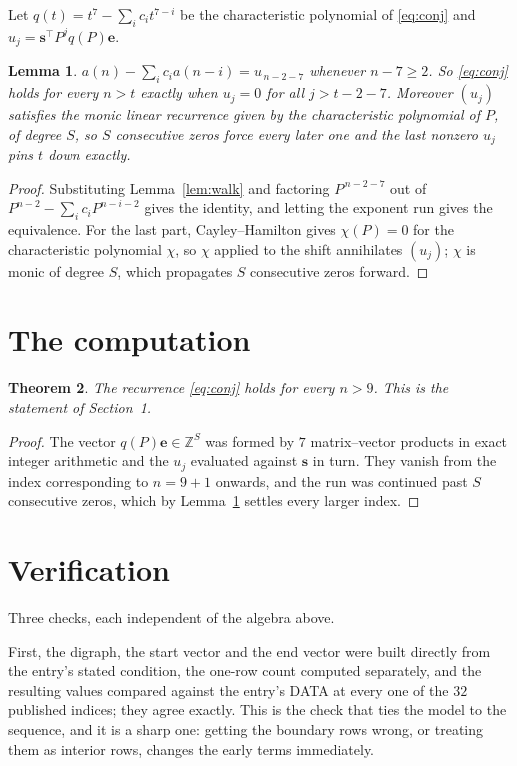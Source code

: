 \documentclass[11pt,a4paper]{article}
\theoremstyle{plain}
\newtheorem{theorem}{Theorem}
\newtheorem{lemma}[theorem]{Lemma}
\theoremstyle{definition}
\begin{document}
Let $q(t)=t^{7}-\sum_i c_i t^{7-i}$ be the characteristic polynomial of
\eqref{eq:conj} and $u_j=\mathbf{s}^{\!\top}P^{j}q(P)\mathbf{e}$.

\begin{lemma}\label{lem:crit}
$a(n)-\sum_i c_i a(n-i)=u_{\,n-2-7}$ whenever $n-7\ge2$. So \eqref{eq:conj}
holds for every $n>t$ exactly when $u_j=0$ for all $j>t-2-7$. Moreover $(u_j)$
satisfies the monic linear recurrence given by the characteristic polynomial of $P$, of
degree $S$, so $S$ consecutive zeros force every later one and the last nonzero $u_j$ pins
$t$ down exactly.
\end{lemma}

\begin{proof}
Substituting Lemma~\ref{lem:walk} and factoring $P^{\,n-2-7}$ out of
$P^{n-2}-\sum_i c_i P^{n-i-2}$ gives the identity, and letting the exponent run gives the
equivalence. For the last part, Cayley--Hamilton gives $\chi(P)=0$ for the characteristic
polynomial $\chi$, so $\chi$ applied to the shift annihilates $(u_j)$; $\chi$ is monic of
degree $S$, which propagates $S$ consecutive zeros forward.
\end{proof}

\section{The computation}

\begin{theorem}
The recurrence \eqref{eq:conj} holds for every $n>9$. This is the statement of
Section~1.
\end{theorem}

\begin{proof}
The vector $q(P)\mathbf{e}\in\mathbb{Z}^{S}$ was formed by $7$ matrix--vector
products in exact integer arithmetic and the $u_j$ evaluated against $\mathbf{s}$ in turn.
They vanish from the index corresponding to $n=9+1$ onwards, and the run was continued
past $S$ consecutive zeros, which by Lemma~\ref{lem:crit} settles every larger index.
\end{proof}

\section{Verification}

Three checks, each independent of the algebra above.

First, the digraph, the start vector and the end vector were built directly from the
entry's stated condition, the one-row count computed separately, and the resulting values
compared against the entry's DATA at every one of the $32$ published indices; they
agree exactly. This is the check that ties the model to the sequence, and it is a sharp one:
getting the boundary rows wrong, or treating them as interior rows, changes the early terms
immediately.
\end{document}
